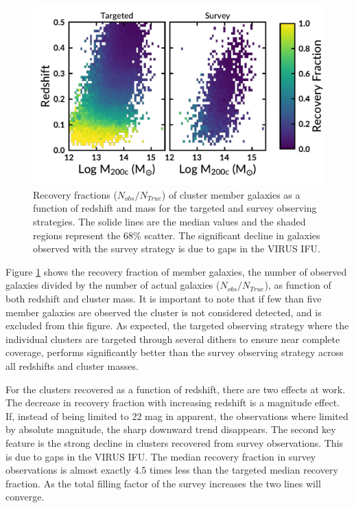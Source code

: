 \documentclass[fleqn,usenatbib]{mnras}
\begin{document}
\begin{figure}
	\includegraphics[width=\textwidth]{figures/recovery.pdf} 
	\caption{Recovery fractions ($N_{obs}/N_{True}$) of cluster member galaxies as a function of redshift and mass for the targeted and survey observing strategies. The solide lines are the median values and the shaded regions represent the 68\% scatter. The significant decline in galaxies observed with the survey strategy is due to gaps in the VIRUS IFU.} \label{fig: recovery} 
\end{figure}

Figure \ref{fig: recovery} shows the recovery fraction of member galaxies, the number of observed galaxies divided by the number of actual galaxies ($N_{obs}/N_{True}$), as function of both redshift and cluster mass. It is important to note that if few than five member galaxies are observed the cluster is not considered detected, and is excluded from this figure. As expected, the targeted observing strategy where the individual clusters are targeted through several dithers to ensure near complete coverage, performs significantly better than the survey observing strategy across all redshifts and cluster masses. 

For the clusters recovered as a function of redshift, there are two effects at work. The decrease in recovery fraction with increasing redshift is a magnitude effect. If, instead of being limited to 22 mag in \sdssg apparent, the observations where limited by absolute magnitude, the sharp downward trend disappears. The second key feature is the strong decline in clusters recovered from survey observations. This is due to gaps in the VIRUS IFU. The median recovery fraction in survey observations is almost exactly 4.5 times less than the targeted median recovery fraction. As the total filling factor of the survey increases the two lines will converge.
\end{document}
